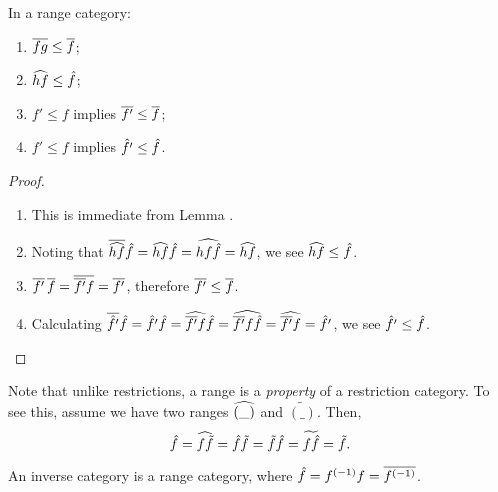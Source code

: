 \begin{lemma}\label{lem:ordering_of_restriction_and_range}
  In a range category:
  \begin{multicols}{2}
    \begin{enumerate}[{(}i{)}]
      \item $\overline{f g} \le \overline{f}$; \label{lemitem:ordering_1}
      \item  $\widehat{h f} \le \hat{f}$; \label{lemitem:ordering_2}
      \item $f' \le f$ implies $\overline{f'} \le \overline{f}$; \label{lemitem:ordering_3}
      \item $f' \le f$ implies $\hat{f'} \le \hat{f}$. \label{lemitem:ordering_4}
    \end{enumerate}
  \end{multicols}
\end{lemma}
\begin{proof}
  \prepprooflist
  \begin{enumerate}[{(}i{)}]
    \item This is immediate from Lemma .
    \item Noting that $\overline{\widehat{hf}} \hat{f} = \widehat{hf} \hat{f}  = \widehat{hf \hat{f}} = \widehat{h f}$,
      we see $\widehat{h f} \le \hat{f}$.
    \item  $\overline{f'}\,\overline{f} = \overline{\overline{f'} f} = \overline{f'}$, therefore $\overline{f'} \le \overline{f}$.
    \item Calculating $\overline{\hat{f'}} \hat{f} = \hat{f'} \hat{f} = \widehat{\overline{f'} f} \hat{f} =
      \widehat{\overline{f'} f \hat{f}} = \widehat{\overline{f'} f} = \hat{f'}$, we see $\hat{f'} \le \hat{f}$.
  \end{enumerate}
\end{proof}
\begin{remark}
  Note that unlike restrictions, a range is a \emph{property} of a restriction category. To see
  this, assume we have two ranges $\widehat{(\_)}$ and $\widetilde{(\_)}$. Then,
  \[\hat{f}=\widehat{f \tilde{f}}=\hat{f} \tilde{f}=\tilde{f} \hat{f}=\widetilde{f \hat{f}}=\tilde{f}.\]
\end{remark}
\begin{lemma}\label{lem:inverse_categories_are_range_categories}
  An inverse category \X is a range category, where $\hat{f} = {f}^{(-1)}f = \overline{{f}^{(-1)}}$.
\end{lemma}
